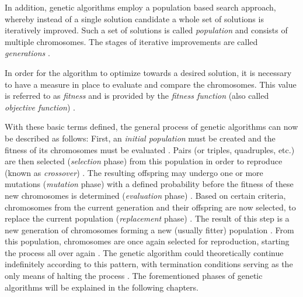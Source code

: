 \documentclass[sigconf]{acmart}
\begin{document}
In addition, genetic algorithms employ a population based search approach,
whereby instead of a single solution candidate a whole set of solutions is
iteratively improved. Such a set of solutions is called \textit{population}
and consists of multiple chromosomes. The stages of iterative improvements
are called \textit{generations} \cite{Affenzeller2009}.

In order for the algorithm to optimize towards a desired solution, it is
necessary to have a measure in place to evaluate and compare the chromosomes.
This value is referred to as \textit{fitness} and is provided by the
\textit{fitness function} (also called \textit{objective function})
\cite{Affenzeller2009}.

With these basic terms defined, the general process of genetic algorithms
can now be described as follows:
First, an \textit{initial population} must be created and the fitness of its
chromosomes must be evaluated \cite{Affenzeller2009}.
Pairs (or triples, quadruples, etc.) are then selected
(\textit{selection} phase) from this population in order to reproduce
(known as \textit{crossover}) \cite{Affenzeller2009}.
The resulting offspring may undergo one or more mutations
(\textit{mutation} phase) with a defined probability before the fitness of
these new chromosomes is determined (\textit{evaluation} phase)
\cite{Affenzeller2009}.
Based on certain criteria, chromosomes from the current generation and their
offspring are now selected, to replace the current population
(\textit{replacement} phase) \cite{Affenzeller2009}.
The result of this step is a new generation of chromosomes forming a new
(usually fitter) population \cite{Affenzeller2009}.
From this population, chromosomes are once again selected for reproduction,
starting the process all over again \cite{Affenzeller2009}.
The genetic algorithm could theoretically continue indefinitely according to
this pattern, with termination conditions serving as the only means of halting
the process \cite{Beligiannis2009}.
%
The forementioned phases of genetic algorithms will be explained in the
following chapters.

\end{document}
